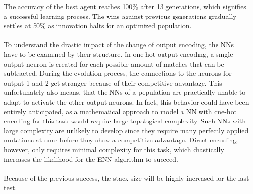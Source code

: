     The accuracy of the best agent reaches 100\% after 13 generations, which signifies a successful learning process.
    The wins against previous generations gradually settles at 50\% as innovation halts for an optimized population.
    \\ \\
    To understand the drastic impact of the change of output encoding, the NNs have to be examined by their structure.
    In one-hot output encoding, a single output neuron is created for each possible amount of matches that can be subtracted.
    During the evolution process, the connections to the neurons for output 1 and 2 get stronger because of their competitive advantage.
    This unfortunately also means, that the NNs of a population are practically unable to adapt to activate the other output neurons.
    In fact, this behavior could have been entirely anticipated, as a mathematical approach to model a NN with one-hot encoding for this task would require large topological complexity.
    Such NNs with large complexity are unlikely to develop since they require many perfectly applied mutations at once before they show a competitive advantage.
    Direct encoding, however, only requires minimal complexity for this task, which drastically increases the likelihood for the ENN algorithm to succeed.
    \\\\
    Because of the previous success, the stack size will be highly increased for the last test.

